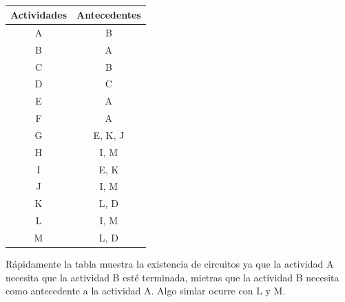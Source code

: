 \documentclass[autocontact]{gaceta}
\begin{document}
        \begin{table}[h]
            \begin{center}
            
                \begin{tabular}{|c|c|}
                    \hline
                    Actividades & Antecedentes \\
                    \hline
                    A & B \\
                    \hline
                    B & A \\
                    \hline
                    C & B \\
                    \hline
                    D & C \\
                    \hline
                    E & A \\
                    \hline
                    F & A \\
                    \hline 
                    G & E, K, J \\
                    \hline 
                    H & I, M \\
                    \hline
                    I & E, K  \\
                    \hline 
                    J & I, M \\ 
                    \hline 
                    K & L, D \\   
                    \hline 
                    L & I, M \\  
                    \hline 
                    M & L, D \\           
                    \hline                      
                
                \end{tabular}   
            
            \end{center}
            \caption{}
        \end{table}

        Rápidamente la tabla muestra la existencia de circuitos ya que la actividad A necesita que 
        la actividad B esté terminada, mietras que la actividad B necesita como antecedente a la 
        actividad A. Algo simlar ocurre con L y M.






\end{document}
